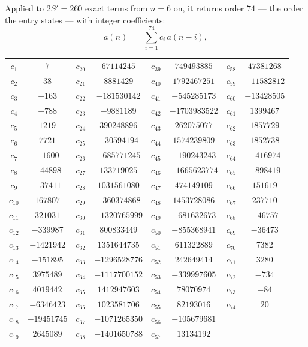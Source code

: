 \documentclass[11pt,a4paper]{article}
\theoremstyle{plain}
\theoremstyle{definition}
\begin{document}
Applied to $2S'=260$ exact terms from $n=6$ on, it returns order $74$ --- the
order the entry states --- with integer coefficients:
\[
a(n)\;=\;\sum_{i=1}^{74}c_i\,a(n-i),
\]
\begin{center}\small
\begin{tabular}{cccccccc}
$c_{1}$ & $7$ & $c_{20}$ & $67114245$ & $c_{39}$ & $749493885$ & $c_{58}$ & $47381268$ \\
$c_{2}$ & $38$ & $c_{21}$ & $8881429$ & $c_{40}$ & $1792467251$ & $c_{59}$ & $-11582812$ \\
$c_{3}$ & $-163$ & $c_{22}$ & $-181530142$ & $c_{41}$ & $-545285173$ & $c_{60}$ & $-13428505$ \\
$c_{4}$ & $-788$ & $c_{23}$ & $-9881189$ & $c_{42}$ & $-1703983522$ & $c_{61}$ & $1399467$ \\
$c_{5}$ & $1219$ & $c_{24}$ & $390248896$ & $c_{43}$ & $262075077$ & $c_{62}$ & $1857729$ \\
$c_{6}$ & $7721$ & $c_{25}$ & $-30594194$ & $c_{44}$ & $1574239809$ & $c_{63}$ & $1852738$ \\
$c_{7}$ & $-1600$ & $c_{26}$ & $-685771245$ & $c_{45}$ & $-190243243$ & $c_{64}$ & $-416974$ \\
$c_{8}$ & $-44898$ & $c_{27}$ & $133719025$ & $c_{46}$ & $-1665623774$ & $c_{65}$ & $-898419$ \\
$c_{9}$ & $-37411$ & $c_{28}$ & $1031561080$ & $c_{47}$ & $474149109$ & $c_{66}$ & $151619$ \\
$c_{10}$ & $167807$ & $c_{29}$ & $-360374868$ & $c_{48}$ & $1453728086$ & $c_{67}$ & $237710$ \\
$c_{11}$ & $321031$ & $c_{30}$ & $-1320765999$ & $c_{49}$ & $-681632673$ & $c_{68}$ & $-46757$ \\
$c_{12}$ & $-339987$ & $c_{31}$ & $800833449$ & $c_{50}$ & $-855368941$ & $c_{69}$ & $-36473$ \\
$c_{13}$ & $-1421942$ & $c_{32}$ & $1351644735$ & $c_{51}$ & $611322889$ & $c_{70}$ & $7382$ \\
$c_{14}$ & $-151895$ & $c_{33}$ & $-1296528776$ & $c_{52}$ & $242649414$ & $c_{71}$ & $3280$ \\
$c_{15}$ & $3975489$ & $c_{34}$ & $-1117700152$ & $c_{53}$ & $-339997605$ & $c_{72}$ & $-734$ \\
$c_{16}$ & $4019442$ & $c_{35}$ & $1412947603$ & $c_{54}$ & $78070974$ & $c_{73}$ & $-84$ \\
$c_{17}$ & $-6346423$ & $c_{36}$ & $1023581706$ & $c_{55}$ & $82193016$ & $c_{74}$ & $20$ \\
$c_{18}$ & $-19451745$ & $c_{37}$ & $-1071265350$ & $c_{56}$ & $-105679681$ &  &  \\
$c_{19}$ & $2645089$ & $c_{38}$ & $-1401650788$ & $c_{57}$ & $13134192$ &  &  \\
\end{tabular}
\end{center}
\end{document}
